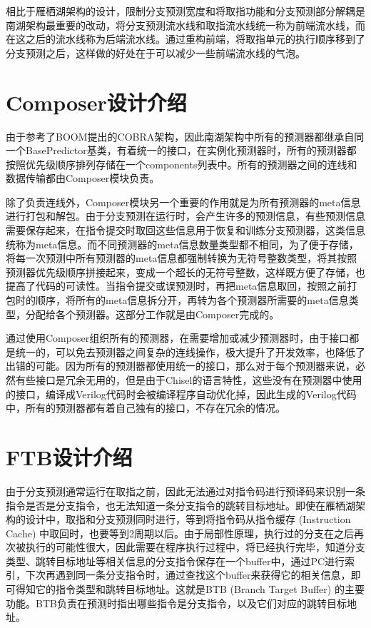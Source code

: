 相比于雁栖湖架构的设计，限制分支预测宽度和将取指功能和分支预测部分解耦是南湖架构最重要的改动，将分支预测流水线和取指流水线统一称为前端流水线，而在这之后的流水线称为后端流水线。通过重构前端，将取指单元的执行顺序移到了分支预测之后，这样做的好处在于可以减少一些前端流水线的气泡。

\section{Composer设计介绍}

由于参考了BOOM提出的COBRA架构\cite{cobra}，因此南湖架构中所有的预测器都继承自同一个BasePredictor基类，有着统一的接口，在实例化预测器时，所有的预测器都按照优先级顺序排列存储在一个components列表中。所有的预测器之间的连线和数据传输都由Composer模块负责。

除了负责连线外，Composer模块另一个重要的作用就是为所有预测器的meta信息进行打包和解包。由于分支预测在运行时，会产生许多的预测信息，有些预测信息需要保存起来，在指令提交时取回这些信息用于恢复和训练分支预测器，这类信息统称为meta信息。而不同预测器的meta信息数量类型都不相同，为了便于存储，将每一次预测中所有预测器的meta信息都强制转换为无符号整数类型，将其按照预测器优先级顺序拼接起来，变成一个超长的无符号整数，这样既方便了存储，也提高了代码的可读性。当指令提交或误预测时，再把meta信息取回，按照之前打包时的顺序，将所有的meta信息拆分开，再转为各个预测器所需要的meta信息类型，分配给各个预测器。这部分工作就是由Composer完成的。

通过使用Composer组织所有的预测器，在需要增加或减少预测器时，由于接口都是统一的，可以免去预测器之间复杂的连线操作，极大提升了开发效率，也降低了出错的可能。因为所有的预测器都使用统一的接口，那么对于每个预测器来说，必然有些接口是冗余无用的，但是由于Chisel的语言特性，这些没有在预测器中使用的接口，编译成Verilog代码时会被编译程序自动优化掉，因此生成的Verilog代码中，所有的预测器都有着自己独有的接口，不存在冗余的情况。

\section{FTB设计介绍}

由于分支预测通常运行在取指之前，因此无法通过对指令码进行预译码来识别一条指令是否是分支指令，也无法知道一条分支指令的跳转目标地址。即使在雁栖湖架构的设计中，取指和分支预测同时进行，等到将指令码从指令缓存 (Instruction Cache) 中取回时，也要等到2周期以后。由于局部性原理，执行过的分支在之后再次被执行的可能性很大，因此需要在程序执行过程中，将已经执行完毕，知道分支类型、跳转目标地址等相关信息的分支指令保存在一个buffer中，通过PC进行索引，下次再遇到同一条分支指令时，通过查找这个buffer来获得它的相关信息，即可得知它的指令类型和跳转目标地址。这就是BTB (Branch Target Buffer) 的主要功能。BTB负责在预测时指出哪些指令是分支指令，以及它们对应的跳转目标地址。

